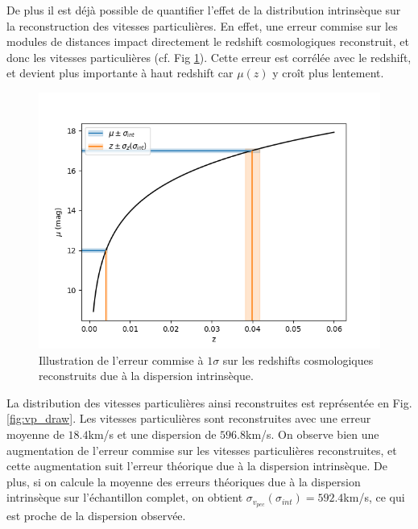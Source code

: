 \documentclass{book}
\begin{document}
De plus il est déjà possible de quantifier l'effet de la distribution intrinsèque sur la reconstruction des vitesses particulières. En effet, une erreur commise sur les modules de distances impact directement le redshift cosmologiques reconstruit, et donc les vitesses particulières (cf. Fig \ref{fig:vp_sigma_int}). Cette erreur est corrélée avec le redshift, et devient plus importante à haut redshift car $\mu(z)$ y croît plus lentement.

\begin{figure}
	\centering
	\includegraphics[width=0.8\linewidth]{figures/sigma_int_effect_vp.png}
	\caption{Illustration de l'erreur commise à $1\sigma$ sur les redshifts cosmologiques reconstruits due à la dispersion intrinsèque.}
	\label{fig:vp_sigma_int}
\end{figure}

La distribution des vitesses particulières ainsi reconstruites est représentée en Fig. \ref{fig:vp_draw}. Les vitesses particulières sont reconstruites avec une erreur moyenne de $18.4$km/s et une dispersion de $596.8$km/s. On observe bien une augmentation de l'erreur commise sur les vitesses particulières reconstruites, et cette augmentation suit l'erreur théorique due à la dispersion intrinsèque. De plus, si on calcule la moyenne des erreurs théoriques due à la dispersion intrinsèque sur l'échantillon complet, on obtient $\sigma_{v_{pec}}(\sigma_{int}) = 592.4$km/s, ce qui est proche de la dispersion observée.
\end{document}
